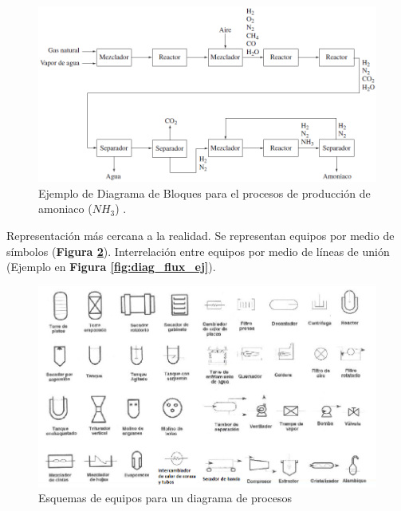             \begin{figure}
                \centering
                \includegraphics[width=.8\textwidth]{img/esquemas/diagrama_bloq_ej.png}
                \caption[Ejemplo de Diagrama de Bloques]{Ejemplo de Diagrama de Bloques para el procesos de producción de amoniaco (\(NH_{3}\)) \cite{murphy_introduction_2007}.}
                \label{fig:diag_bloq_ej}
            \end{figure}
            
            
            Representación más cercana a la realidad. Se representan equipos por medio de símbolos (\textbf{Figura \ref{fig:diag_flux_equip}}). Interrelación entre equipos por medio de líneas de unión (Ejemplo en \textbf{Figura \ref{fig:diag_flux_ej}}).
            
            \begin{figure}
                \centering
                \includegraphics[width=\textwidth]{img/esquemas/diagrama_flux_equip.png}
                \caption{Esquemas de equipos para un diagrama de procesos}
                \label{fig:diag_flux_equip}
            \end{figure}
            

